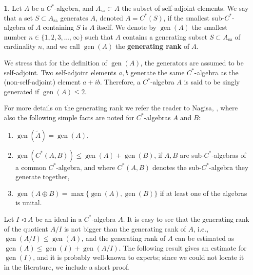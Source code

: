\documentclass{amsart}
\theoremstyle{definition}
\newtheorem{pargr}[lma]{}
\begin{document}
\begin{pargr}
\label{pargr:Generators}
    Let $A$ be a {{$C^*$-al\-ge\-bra}}{}, and $A_\text{sa}\subset A$ the subset of self-adjoint elements.
    We say that a set $S\subset A_\text{sa}$ generates $A$, denoted $A=C^\ast(S)$, if the smallest sub-{{$C^*$-al\-ge\-bra}}{} of $A$ containing $S$ is $A$ itself.
    We denote by $\operatorname{gen}(A)$  the smallest number $n\in\{1,2,3,\ldots,\infty\}$ such that $A$ contains a generating subset $S\subset A_\text{sa}$ of cardinality $n$, and we call $\operatorname{gen}(A)$ the {\textbf{{generating rank}}} of $A$.

    We stress that for the definition of $\operatorname{gen}(A)$, the generators are assumed to be self-adjoint.
    Two self-adjoint elements $a,b$ generate the same {{$C^*$-al\-ge\-bra}}{} as the (non-self-adjoint) element $a+ib$.
    Therefore, a {{$C^*$-al\-ge\-bra}}{} $A$ is said to be singly generated if $\operatorname{gen}(A)\leq 2$.

    For more details on the generating rank we refer the reader to Nagisa, \cite{Nag2004}, where also the following simple facts are noted for {{$C^*$-al\-ge\-bra}}{s} $A$ and $B$:
    \begin{enumerate}[(1)   ]
        \item
        $\operatorname{gen}(\widetilde{A})=\operatorname{gen}(A)$,
        \item
        $\operatorname{gen}(C^*(A,B))\leq\operatorname{gen}(A)+\operatorname{gen}(B)$, if $A,B$ are sub-{{$C^*$-al\-ge\-bra}}{s} of a common {{$C^*$-al\-ge\-bra}}{}, and where $C^*(A,B)$ denotes the sub-{{$C^*$-al\-ge\-bra}}{} they generate together,
        \item
        $\operatorname{gen}(A\oplus B)=\max\{\operatorname{gen}(A),\operatorname{gen}(B)\}$ if at least one of the algebras is unital.
    \end{enumerate}

    Let $I\lhd A$ be an ideal in a {{$C^*$-al\-ge\-bra}}{} $A$.
    It is easy to see that the generating rank of the quotient $A/I$ is not bigger than the generating rank of $A$, i.e., $\operatorname{gen}(A/I)\leq\operatorname{gen}(A)$, and the generating rank of $A$ can be estimated as $\operatorname{gen}(A)\leq\operatorname{gen}(I)+\operatorname{gen}(A/I)$.
    The following result gives an estimate for $\operatorname{gen}(I)$, and it is probably well-known to  experts;
    since we could not locate it in the literature,  we include a short proof.
\end{pargr}
\end{document}
